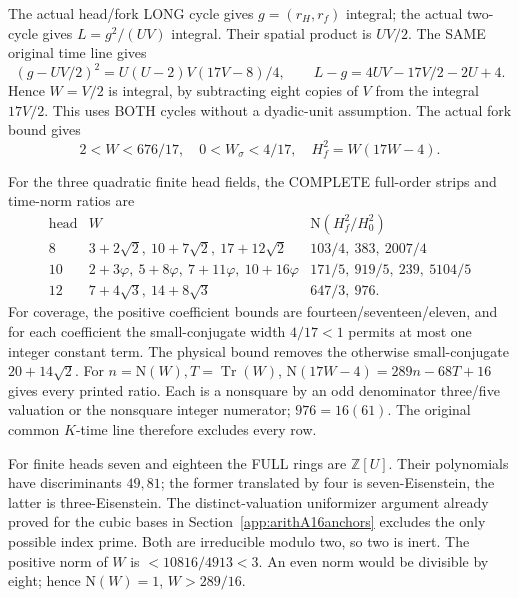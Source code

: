 \documentclass[11pt]{article}
\begin{document}
The actual head/fork LONG cycle gives
\(g=(r_H,r_f)\) integral; the actual two-cycle
gives \(L=g^2/(UV)\) integral.
Their spatial product is \(UV/2\).
The SAME original time line gives
\[
 (g-UV/2)^2=U(U-2)V(17V-8)/4,\qquad
 L-g=4UV-17V/2-2U+4 .
\]
Hence \(W=V/2\) is integral, by subtracting
eight copies of \(V\) from the integral \(17V/2\).
This uses BOTH cycles without a dyadic-unit
assumption.
The actual fork bound gives
\[
                  2<W<676/17,\quad0<W_\sigma<4/17,\quad
                  H_f^2=W(17W-4).
\tag{D17W}\label{eq:arithD17forkstrip}
\]

For the three quadratic finite head fields,
the COMPLETE full-order strips and time-norm
ratios are
\[
\begin{array}{c|l|l}
 \text{head}&W&\mathrm N(H_f^2/H_0^2)\\ \hline
8&
 3+2\sqrt2,\ 10+7\sqrt2,\ 17+12\sqrt2&
 103/4,\ 383,\ 2007/4\\
10&
 2+3\varphi,\ 5+8\varphi,\ 7+11\varphi,\ 10+16\varphi&
 171/5,\ 919/5,\ 239,\ 5104/5\\
12&
 7+4\sqrt3,\ 14+8\sqrt3&
 647/3,\ 976 .
\end{array}
\]
For coverage, the positive coefficient bounds
are fourteen/seventeen/eleven, and for each
coefficient the small-conjugate width \(4/17<1\)
permits at most one integer constant term.
The physical bound removes the otherwise
small-conjugate \(20+14\sqrt2\).
For \(n=\mathrm N(W),T=\operatorname{Tr}(W)\),
\(\mathrm N(17W-4)=289n-68T+16\)
gives every printed ratio.
Each is a nonsquare by an odd denominator
three/five valuation or the nonsquare integer
numerator; \(976=16(61)\).
The original common \(K\)-time line therefore
excludes every row.

For finite heads seven and eighteen the FULL
rings are \(\mathbb Z[U]\).
Their polynomials have discriminants \(49,81\);
the former translated by four is seven-Eisenstein,
the latter is three-Eisenstein.
The distinct-valuation uniformizer argument
already proved for the cubic bases in
Section~\ref{app:arithA16anchors} excludes the
only possible index prime.
Both are irreducible modulo two, so two is inert.
The positive norm of \(W\) is \(<10816/4913<3\).
An even norm would be divisible by eight;
hence \(\mathrm N(W)=1\), \(W>289/16\).
\end{document}
